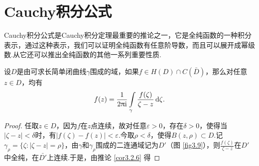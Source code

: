 \section{Cauchy积分公式\label{sec3.4}}
Cauchy积分公式是Cauchy积分定理最重要的推论之一，它是全纯函数的一种积分表示，通过这种表示，我们可以证明全纯函数有任意阶导数，而且可以展开成幂级数.从它还可以推出全纯函数的其他一系列重要性质.
\begin{theorem}\label{thm3.4.1}
  设$D$是由可求长简单闭曲线$\gamma$围成的域，如果$f\in H(D)\cap C(\bar D)$，那么对任意$z\in D$，均有
  \begin{equation}\label{eq3.4.1}
    f(z) = \frac1{2\uppi\mathrm i}\int\limits_\gamma\frac{f(\zeta)}{\zeta-z}\mathop{}\!\mathrm{d} \zeta.
  \end{equation}
\end{theorem}
\begin{proof}
  任取$z\in D$，因为$f$在$z$点连续，故对任意$\varepsilon>0$，存在$\delta>0$，使得当$|\zeta-z|<\delta$时，有$|f(\zeta)-f(z)|<\varepsilon$.今取$\rho<\delta$，使得$B(z,\rho)\subset D$.记$\gamma_\rho=\{\zeta:|\zeta-z|=\rho\}$，由$\gamma$和$\gamma_{\rho}$围成的二连通域记为$D'$（图 \ref{fig3.9}），则$\frac{f(\zeta)}{\zeta-z}$在$D'$中全纯，在$\bar {D'}$上连续.于是，由推论 \ref{cor3.2.6} 得


\end{proof}
